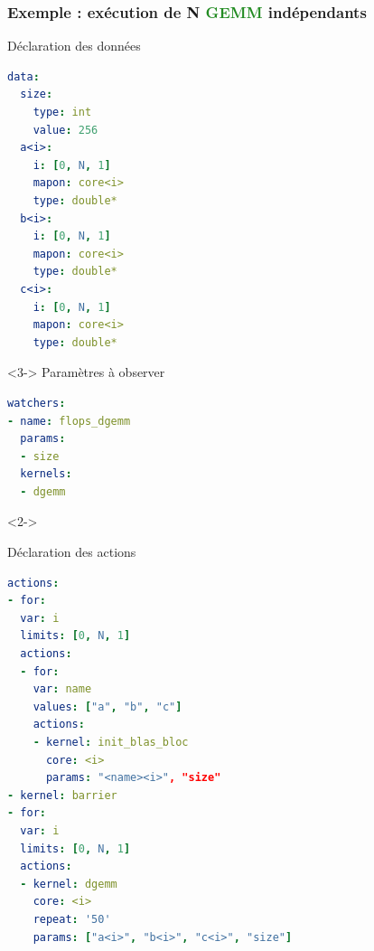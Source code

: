 \documentclass[xcolor={usenames,dvipsnames,svgnames,table}, aspectratio=43]{beamer}
\newcommand{\gemmcolor}[1]{\textcolor{ForestGreen}{\textbf{#1}}\xspace}
\newcommand{\gemm}{\gemmcolor{GEMM}}
\begin{document}
\begin{frame}[fragile]
\frametitle{Exemple : exécution de N \gemm indépendants}

\hspace{0.1cm}
\begin{minipage}[t]{0.38\linewidth}
  Déclaration des données
  \begin{lstlisting}[language=yaml]
data:
  size:
    type: int
    value: 256
  a<i>:
    i: [0, N, 1]
    mapon: core<i>
    type: double*
  b<i>:
    i: [0, N, 1]
    mapon: core<i>
    type: double*
  c<i>:
    i: [0, N, 1]
    mapon: core<i>
    type: double*
  \end{lstlisting}
\begin{uncoverenv}<3->
  Paramètres à observer
  \begin{lstlisting}[language=yaml]
watchers:
- name: flops_dgemm
  params:
  - size
  kernels:
  - dgemm
  \end{lstlisting}
\end{uncoverenv}
\end{minipage}
\hspace{0.3cm}
\begin{uncoverenv}<2->
\begin{minipage}[t]{0.54\linewidth}
  Déclaration des actions
  \begin{lstlisting}[language=yaml]
actions:
- for:
  var: i
  limits: [0, N, 1]
  actions:
  - for:
    var: name
    values: ["a", "b", "c"]
    actions:
    - kernel: init_blas_bloc
      core: <i>
      params: "<name><i>", "size"
- kernel: barrier
- for:
  var: i
  limits: [0, N, 1]
  actions:
  - kernel: dgemm
    core: <i>
    repeat: '50'
    params: ["a<i>", "b<i>", "c<i>", "size"]
  \end{lstlisting}
\end{minipage}
\end{uncoverenv}

\end{frame}
\end{document}
